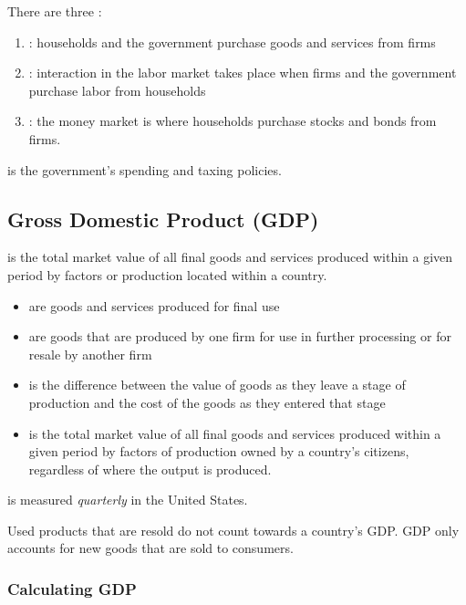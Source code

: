 \documentclass{article}
\begin{document}
There are three :
\begin{enumerate}
  \item {}: households and the government purchase goods and services from firms 
  \item {}: interaction in the labor market takes place when firms and the government purchase labor from households 
  \item {}: the money market is where households purchase stocks and bonds from firms. 
\end{enumerate}

 is the government's spending and taxing policies.  \\ 

\subsection{Gross Domestic Product (GDP)}

 is the total market value of all final goods and services produced within a given period by factors or production located within a country. 
\begin{itemize}
  \item {} are goods and services produced for final use
  \item {} are goods that are produced by one firm for use in further processing or for resale by another firm
  \item {} is the difference between the value of goods as they leave a stage of production and the cost of the goods as they entered that stage
  \item {} is the total market value of all final goods and services produced within a given period by factors of production owned by a country's citizens, regardless of where the output is produced. 
\end{itemize}
 is measured \emph{quarterly} in the United States. 

\begin{remark}
  Used products that are resold do not count towards a country's GDP. GDP only accounts for new goods that are sold to consumers.
\end{remark}

\subsubsection{Calculating GDP}
\end{document}
